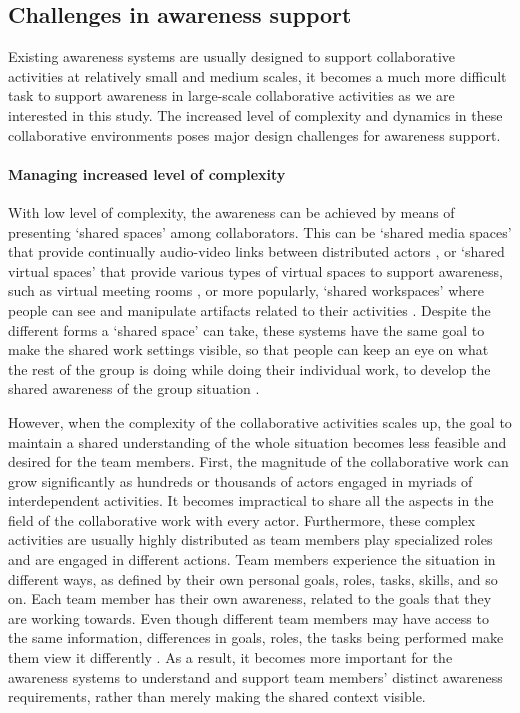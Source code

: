 \subsection{Challenges in awareness support} %
\label{sub:challenges_in_awareness_support}
Existing awareness systems are usually designed to support collaborative activities at relatively small and medium scales, it becomes a much more difficult task to support awareness in large-scale collaborative activities as we are interested in this study. The increased level of complexity and dynamics in these collaborative environments poses major design challenges for awareness support. 

\paragraph*{Managing increased level of complexity} %
\label{par:managing_increased_level_of_complexity}
With low level of complexity, the awareness can be achieved by means of presenting `shared spaces' among collaborators. This can be `shared media spaces' that provide continually audio-video links between distributed actors \cite{Dourish1992}, or `shared virtual spaces' that provide various types of virtual spaces to support awareness, such as virtual meeting rooms \cite{Berlage1999}, or more popularly, `shared workspaces' where people can see and manipulate artifacts related to their activities \cite{Gutwin2002}. Despite the different forms a `shared space' can take, these systems have the same goal to make the shared work settings visible, so that people can keep an eye on what the rest of the group is doing while doing their individual work, to develop the shared awareness of the group situation \cite{schmidt2002a}.

However, when the complexity of the collaborative activities scales up, the goal to maintain a shared understanding of the whole situation becomes less feasible and desired for the team members. First, the magnitude of the collaborative work can grow significantly as hundreds or thousands of actors engaged in myriads of interdependent activities. It becomes impractical to share all the aspects in the field of the collaborative work with every actor. Furthermore, these complex activities are usually highly distributed as team members play specialized roles and are engaged in different actions. Team members experience the situation in different ways, as defined by their own personal goals, roles, tasks, skills, and so on. Each team member has their own awareness, related to the goals that they are working towards. Even though different team members may have access to the same information, differences in goals, roles, the tasks being performed make them view it differently \cite{Salmon2010}. As a result, it becomes more important for the awareness systems to understand and support team members' distinct awareness requirements, rather than merely making the shared context visible.

